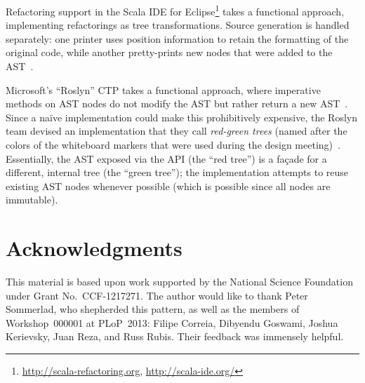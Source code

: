 \documentclass[prodmode]{acmlarge}
\begin{document}
Refactoring support in the Scala IDE for
Eclipse\footnote{\url{http://scala-refactoring.org},
\url{http://scala-ide.org/}} takes a functional approach, implementing
refactorings as tree transformations.  Source generation is handled separately:
one printer uses position information to retain the formatting of the original
code, while another pretty-prints new nodes that were added to the
AST~\cite{stocker10scala}.

Microsoft's ``Roslyn'' CTP takes a functional approach, where imperative
methods on AST nodes do not modify the AST but rather return a new
AST~\cite{vogel12roslyn}.  Since a na\"{i}ve implementation could make this
prohibitively expensive, the Roslyn team devised an implementation that
they call \textit{red-green trees} (named after the colors of the
whiteboard markers that were used during the design
meeting)~\cite{lippert12persistence}.  Essentially, the AST exposed via the API
(the ``red tree'') is a fa\c{c}ade for a different, internal tree (the ``green
tree''); the implementation attempts to reuse existing AST nodes whenever
possible (which is possible since all nodes are immutable).



\section*{Acknowledgments}
This material is based upon work supported by the National Science Foundation
under Grant No.~CCF-1217271.  The author would like to thank Peter Sommerlad,
who shepherded this pattern, as well as the members of Workshop~000001 at
PLoP~2013: Filipe Correia, Dibyendu Goswami, Joshua Kerievsky, Juan Reza, and
Russ Rubis.  Their feedback was immensely helpful.




\end{document}
